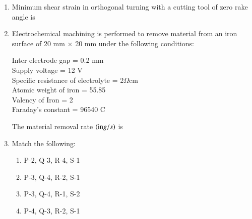 \documentclass[journal]{IEEEtran}
\begin{document}
\begin{enumerate}[leftmargin=0pt]
\item Minimum shear strain in orthogonal turning with a cutting tool of zero rake angle is
\begin{enumerate}
\hfill{}
\end{enumerate}


\item Electrochemical machining is performed to remove material from an iron surface of 20 mm $\times$ 20 mm under the following conditions: 
\begin{center}
    Inter electrode gap = 0.2 mm\\
    Supply voltage = 12 V\\
    Specific resistance of electrolyte = 2$\Omega$cm\\
    Atomic weight of iron = 55.85\\
    Valency of Iron = 2\\
    Faraday's constant = 96540 C\\
\end{center}
The material removal rate $\left(\text{in} g/s\right)$ is
\begin{enumerate}
\hfill{}
\end{enumerate}

\item Match the following:\\
\begin{table}[h]
    \centering
    
    
\end{table}
\begin{enumerate}
  \item P-2, Q-3, R-4, S-1
  \item P-3, Q-4, R-2, S-1
  \item P-3, Q-4, R-1, S-2
  \item P-4, Q-3, R-2, S-1
\hfill{}
\end{enumerate}


\end{enumerate}
\end{document}
